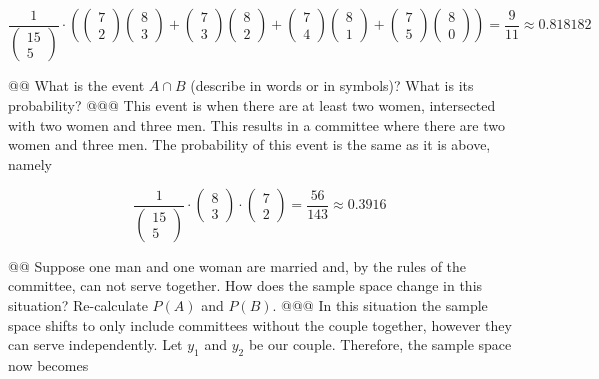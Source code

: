 \documentclass[10pt]{article}
\begin{document}
\begin{easylist}[enumerate]
    \[
        \frac{1}{\begin{pmatrix}15\\5\end{pmatrix}} \cdot
            \left( \begin{pmatrix}7\\2\end{pmatrix}\begin{pmatrix}8\\3\end{pmatrix} +
            \begin{pmatrix}7\\3\end{pmatrix}\begin{pmatrix}8\\2\end{pmatrix} +
            \begin{pmatrix}7\\4\end{pmatrix}\begin{pmatrix}8\\1\end{pmatrix} +
            \begin{pmatrix}7\\5\end{pmatrix}\begin{pmatrix}8\\0\end{pmatrix} \right) =
        \boxed{\frac{9}{11} \approx 0.818182}
    \]

    @@ What is the event $A \cap B$ (describe in words or in symbols)? What is its probability?
    @@@ This event is when there are at least two women, intersected with two women and three men. This results in a committee where there are two women and three men. The probability of this event is the same as it is above, namely

        \[ \frac{1}{\begin{pmatrix}15\\5\end{pmatrix}} \cdot \begin{pmatrix}8\\3\end{pmatrix} \cdot \begin{pmatrix}7\\2\end{pmatrix} = \boxed{\frac{56}{143} \approx 0.3916} \]

    @@ Suppose one man and one woman are married and, by the rules of the committee, can not serve together. How does the sample space change in this situation? Re-calculate $P(A)$ and $P(B)$.
    @@@ In this situation the sample space shifts to only include committees without the couple together, however they can serve independently. Let $y_1$ and $y_2$ be our couple. Therefore, the sample space now becomes


\end{easylist}
\end{document}
